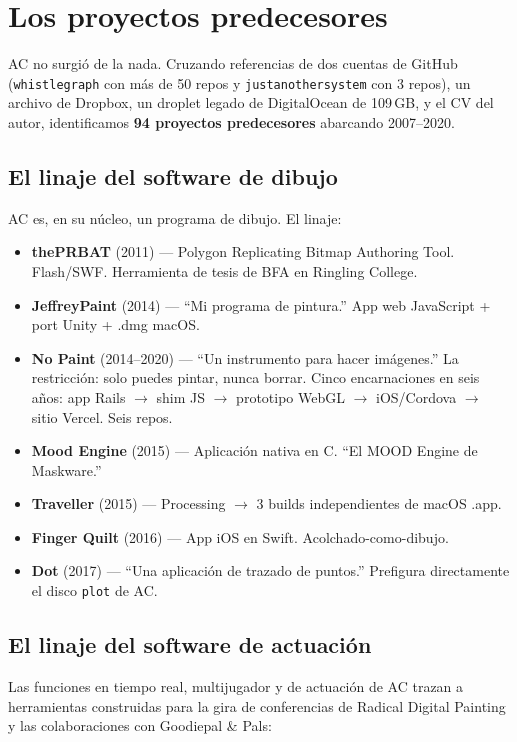 \documentclass[10pt,letterpaper,twocolumn]{article}
\begin{document}
\section{Los proyectos predecesores}

AC no surgió de la nada. Cruzando referencias de dos cuentas de GitHub (\texttt{whistlegraph} con más de 50 repos y \texttt{justanothersystem} con 3 repos), un archivo de Dropbox, un droplet legado de DigitalOcean de 109\,GB, y el CV del autor, identificamos \textbf{94 proyectos predecesores} abarcando 2007--2020.

\subsection{El linaje del software de dibujo}

AC es, en su núcleo, un programa de dibujo. El linaje:

\begin{itemize}
  \item \textbf{thePRBAT} (2011) --- Polygon Replicating Bitmap Authoring Tool. Flash/SWF. Herramienta de tesis de BFA en Ringling College.
  \item \textbf{JeffreyPaint} (2014) --- ``Mi programa de pintura.'' App web JavaScript + port Unity + .dmg macOS.
  \item \textbf{No Paint} (2014--2020) --- ``Un instrumento para hacer imágenes.'' La restricción: solo puedes pintar, nunca borrar. Cinco encarnaciones en seis años: app Rails $\rightarrow$ shim JS $\rightarrow$ prototipo WebGL $\rightarrow$ iOS/Cordova $\rightarrow$ sitio Vercel. Seis repos.
  \item \textbf{Mood Engine} (2015) --- Aplicación nativa en C. ``El MOOD Engine de Maskware.''
  \item \textbf{Traveller} (2015) --- Processing $\rightarrow$ 3 builds independientes de macOS .app.
  \item \textbf{Finger Quilt} (2016) --- App iOS en Swift. Acolchado-como-dibujo.
  \item \textbf{Dot} (2017) --- ``Una aplicación de trazado de puntos.'' Prefigura directamente el disco \texttt{plot} de AC.
\end{itemize}

\subsection{El linaje del software de actuación}

Las funciones en tiempo real, multijugador y de actuación de AC trazan a herramientas construidas para la gira de conferencias de Radical Digital Painting y las colaboraciones con Goodiepal \& Pals:
\end{document}
